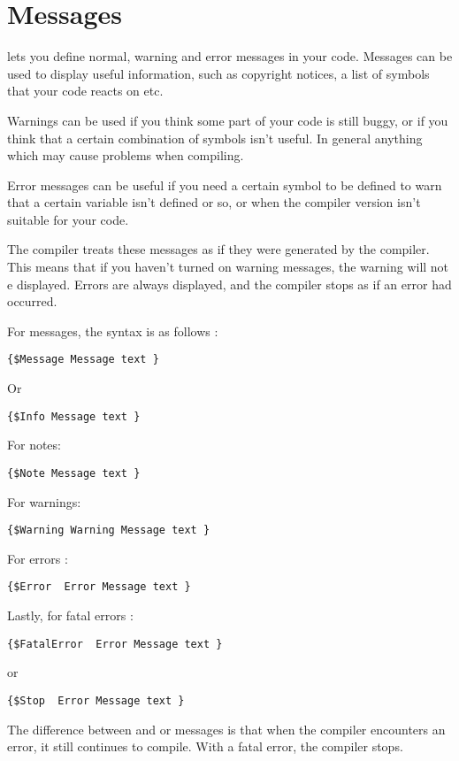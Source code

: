 \documentclass{report}
\begin{document}
\section{Messages}
\label{se:Messages}
\fpc lets you define normal, warning and error messages in your code. 
Messages can be used to display useful information, such as copyright
notices, a list of symbols that your code reacts on etc.

Warnings can be used if you think some part of your code is still buggy, or
if you think that a certain combination of symbols isn't useful. In general
anything which may cause problems when compiling.

Error messages can be useful if you need a certain symbol to be defined
to warn that a certain variable isn't defined or so, or when the compiler
version isn't suitable for your code.

The compiler treats these messages as if they were generated by the
compiler. This means that if you haven't turned on warning messages, the
warning will not e displayed. Errors are always displayed, and the compiler
stops as if an error had occurred.

For messages, the syntax is as follows  :
\begin{verbatim}
{$Message Message text }
\end{verbatim}
Or 
\begin{verbatim}
{$Info Message text }
\end{verbatim}
For notes:
\begin{verbatim}
{$Note Message text }
\end{verbatim}
For warnings:
\begin{verbatim}
{$Warning Warning Message text }
\end{verbatim}
For errors :
\begin{verbatim}
{$Error  Error Message text }
\end{verbatim}
Lastly, for fatal errors :
\begin{verbatim}
{$FatalError  Error Message text }
\end{verbatim}
or
\begin{verbatim}
{$Stop  Error Message text }
\end{verbatim}
The difference between  and  or 
messages is that when the compiler encounters an error, it still continues
to compile. With a fatal error, the compiler stops.
\end{document}
